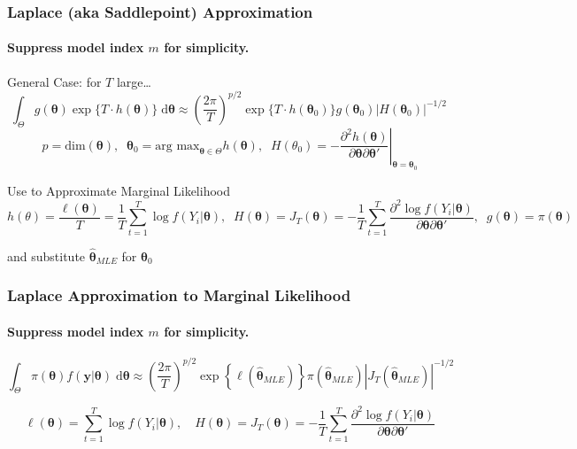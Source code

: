 \begin{frame}
  \frametitle{Laplace (aka Saddlepoint) Approximation}
  \framesubtitle{Suppress model index $m$ for simplicity.}

  \footnotesize

  \begin{block}{General Case: for $T$ large\dots}
  \small
  \vspace{-1.5em}
  \[
    \int_\Theta g(\boldsymbol{\theta})\exp\{T \cdot h(\boldsymbol{\theta})\}\;\text{d}\boldsymbol{\theta} \approx \left( \frac{2\pi}{T} \right)^{p/2}\exp\{ T\cdot h(\boldsymbol{\theta}_0) \} g(\boldsymbol{\theta}_0)  \left|H(\boldsymbol{\theta}_0)\right|^{-1/2} \
  \]
  \[
    p = \text{dim}(\boldsymbol{\theta}), \; \; \boldsymbol{\theta}_0 = \text{arg max}_{\boldsymbol{\theta}\in \Theta} h(\boldsymbol{\theta}), \; \;
    H(\theta_0) = \left.-\frac{\partial^2 h(\boldsymbol{\theta})}{\partial \boldsymbol{\theta} \partial \boldsymbol{\theta}'} \right|_{\boldsymbol{\theta} = \boldsymbol{\theta}_0}
  \]
\end{block}

\pause

\begin{block}{Use to Approximate Marginal Likelihood}
  \vspace{-1em}
  \scriptsize
  \[
    h(\theta) = \frac{\ell(\boldsymbol{\theta})}{T} = \frac{1}{T}\sum_{t=1}^T \log f(Y_i|\boldsymbol{\theta}), \; \;
    H(\boldsymbol{\theta}) = J_T(\boldsymbol{\theta}) = -\frac{1}{T}\sum_{t=1}^T \frac{\partial^2 \log f(Y_i|\boldsymbol{\theta})}{\partial \boldsymbol{\theta}\partial\boldsymbol{\theta}'}, \; \; g(\boldsymbol{\theta}) = \pi(\boldsymbol{\theta})
  \]

  \normalsize
  \vspace{1em}
  \alert{and substitute $\widehat{\boldsymbol{\theta}}_{MLE}$ for $\boldsymbol{\theta}_0$}
\end{block}

\end{frame}
\begin{frame}
  \frametitle{Laplace Approximation to Marginal Likelihood}
  \framesubtitle{Suppress model index $m$ for simplicity.}

\small
  \[
    \int_\Theta \pi(\boldsymbol{\theta})f(\mathbf{y}|\boldsymbol{\theta})\;\text{d}\boldsymbol{\theta} \approx \left( \frac{2\pi}{T} \right)^{p/2}\exp\left\{ \ell(\widehat{\boldsymbol{\theta}}_{MLE})\right\} \pi(\widehat{\boldsymbol{\theta}}_{MLE})  \left|J_T(\widehat{\boldsymbol{\theta}}_{MLE})\right|^{-1/2}
  \]

  \footnotesize
  \[
  \ell(\boldsymbol{\theta}) = \sum_{t=1}^T \log f(Y_i|\boldsymbol{\theta}), \quad
    H(\boldsymbol{\theta}) = J_T(\boldsymbol{\theta}) = -\frac{1}{T}\sum_{t=1}^T \frac{\partial^2 \log f(Y_i|\boldsymbol{\theta})}{\partial \boldsymbol{\theta}\partial\boldsymbol{\theta}'}
  \]

\end{frame}
